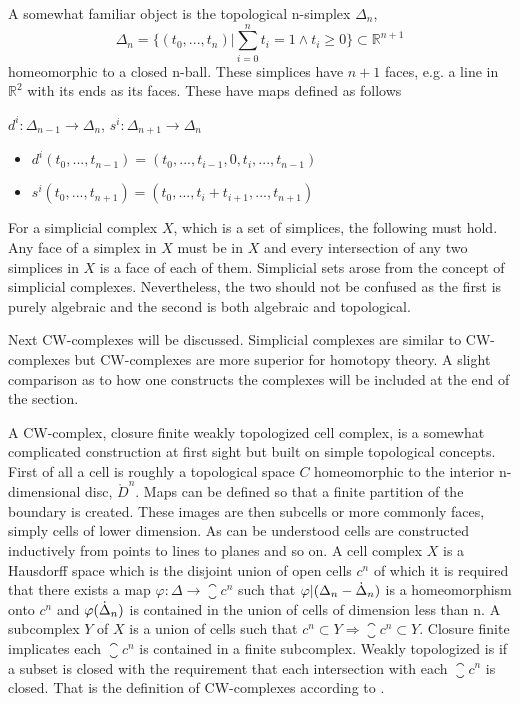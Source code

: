 \documentclass[../../main.tex]{subfiles}
\begin{document}
    A somewhat familiar object is the topological n-simplex $\Delta_n$,
    \begin{equation}
        \Delta_n = \{(t_0, . . . , t_n)  |\sum_{i=0}^{n}t_i=1 \wedge t_i \geq 0\} \subset \mathbb{R}^{n+1}
    \end{equation}
    homeomorphic to a closed n-ball. These simplices have $n+1$ faces, e.g. a line in $\mathbb{R}^2$ with its ends as its faces. These have maps defined as follows
    
    \begin{definition}\label{simp-map}
        $d^i:\Delta_{n-1}\to \Delta_n$, $s^i:\Delta_{n+1}\to \Delta_n$
        \begin{itemize}
           \item $d^i(t_0,...,t_{n-1})=(t_0,...,t_{i-1},0,t_i,...,t_{n-1})$
           \item $s^i(t_0,...,t_{n+1})=(t_0,...,t_i+t_{i+1},...,t_{n+1})$
        \end{itemize}
    \end{definition}
    
    For a simplicial complex $X$, which is a set of simplices, the following must hold. Any face of a simplex in $X$ must be in $X$ and every intersection of any two simplices in $X$ is a face of each of them. Simplicial sets arose from the concept of simplicial complexes. Nevertheless, the two should not be confused as the first is purely algebraic and the second is both algebraic and topological.
    
    Next CW-complexes will be discussed. Simplicial complexes are similar to CW-complexes but CW-complexes are more superior for homotopy theory. A slight comparison as to how one constructs the complexes will be included at the end of the section. 
    
    A CW-complex, closure finite weakly topologized cell complex, is a somewhat complicated construction at first sight but built on simple topological concepts. First of all a cell is roughly a topological space $C$ homeomorphic to the interior n-dimensional disc, $\mathring{D}^n$. Maps can be defined so that a finite partition of the boundary is created. These images are then subcells or more commonly faces, simply cells of lower dimension. As can be understood cells are constructed inductively from points to lines to planes and so on. A cell complex $X$ is a Hausdorff space which is the disjoint union of open cells $c^n$ of which it is required that there exists a map $\varphi:\Delta\to\closure{c}^n$ such that $\varphi|(\Delta_n - \dot{\Delta}_n )$ is a homeomorphism onto $c^n$ and $\varphi(\dot{\Delta}_n)$ is contained in the union of cells of dimension less than n. A subcomplex $Y$ of $X$ is a union of cells such that $c^n\subset Y \Rightarrow \closure{c}^n\subset Y$. Closure finite implicates each $\closure{c}^n$ is contained in a finite subcomplex. Weakly topologized is if a subset is closed with the requirement that each intersection with each $\closure{c}^n$ is closed. That is the definition of CW-complexes according to \cite{simp-maye}.
    
\end{document}
